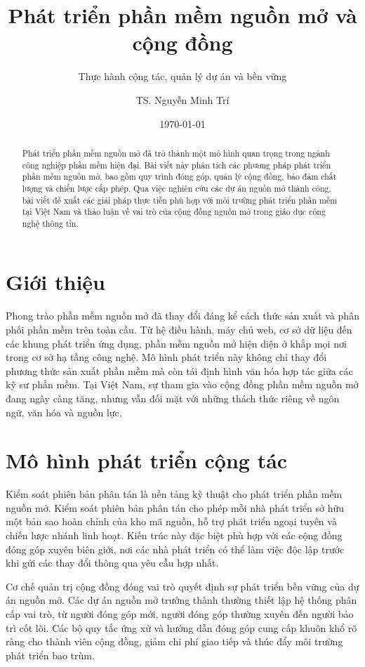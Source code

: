\documentclass[
    language=vietnamese,
    doctype=article,
]{../../omnilatex}
\title{Phát triển phần mềm nguồn mở và cộng đồng}
\subtitle{Thực hành cộng tác, quản lý dự án và bền vững}
\author{TS. Nguyễn Minh Trí}
\date{\today}
\begin{document}
\maketitle

\begin{abstract}
Phát triển phần mềm nguồn mở đã trở thành một mô hình quan trọng trong ngành công nghiệp phần mềm hiện đại. Bài viết này phân tích các phương pháp phát triển phần mềm nguồn mở, bao gồm quy trình đóng góp, quản lý cộng đồng, bảo đảm chất lượng và chiến lược cấp phép. Qua việc nghiên cứu các dự án nguồn mở thành công, bài viết đề xuất các giải pháp thực tiễn phù hợp với môi trường phát triển phần mềm tại Việt Nam và thảo luận về vai trò của cộng đồng nguồn mở trong giáo dục công nghệ thông tin.
\end{abstract}

\section{Giới thiệu}
Phong trào phần mềm nguồn mở đã thay đổi đáng kể cách thức sản xuất và phân phối phần mềm trên toàn cầu. Từ hệ điều hành, máy chủ web, cơ sở dữ liệu đến các khung phát triển ứng dụng, phần mềm nguồn mở hiện diện ở khắp mọi nơi trong cơ sở hạ tầng công nghệ. Mô hình phát triển này không chỉ thay đổi phương thức sản xuất phần mềm mà còn tái định hình văn hóa hợp tác giữa các kỹ sư phần mềm. Tại Việt Nam, sự tham gia vào cộng đồng phần mềm nguồn mở đang ngày càng tăng, nhưng vẫn đối mặt với những thách thức riêng về ngôn ngữ, văn hóa và nguồn lực.

\section{Mô hình phát triển cộng tác}
Kiểm soát phiên bản phân tán là nền tảng kỹ thuật cho phát triển phần mềm nguồn mở. Kiểm soát phiên bản phân tán cho phép mỗi nhà phát triển sở hữu một bản sao hoàn chỉnh của kho mã nguồn, hỗ trợ phát triển ngoại tuyến và chiến lược nhánh linh hoạt. Kiến trúc này đặc biệt phù hợp với các cộng đồng đóng góp xuyên biên giới, nơi các nhà phát triển có thể làm việc độc lập trước khi gửi các thay đổi thông qua yêu cầu hợp nhất.

Cơ chế quản trị cộng đồng đóng vai trò quyết định sự phát triển bền vững của dự án nguồn mở. Các dự án nguồn mở trưởng thành thường thiết lập hệ thống phân cấp vai trò, từ người đóng góp mới, người đóng góp thường xuyên đến người bảo trì cốt lõi. Các bộ quy tắc ứng xử và hướng dẫn đóng góp cung cấp khuôn khổ rõ ràng cho thành viên cộng đồng, giảm chi phí giao tiếp và thúc đẩy môi trường phát triển bao trùm.
\end{document}
